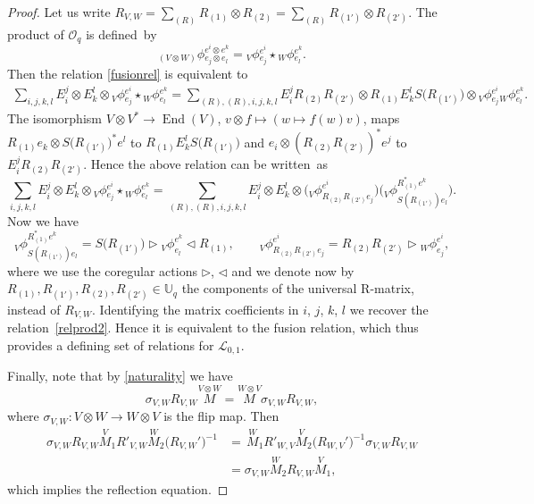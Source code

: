 \documentclass[pdftex]{sigma}%
\numberwithin{equation}{section}
\numberwithin{figure}{section}
\newcommand{\Oq}{\Oo_{q}}
\newcommand{\mUq}{\mathbb{U}_q}
\newcommand{\Ll}{{\mathcal L}}
\newcommand{\Oo}{{\mathcal O}}
\newcommand{\ra}{\rightarrow}
\begin{document}
\begin{proof} Let us write $\textstyle R_{V,W}=\sum_{(R)}R_{(1) }\otimes R_{(2)}=\sum_{(R)}R_{(1') }\otimes R_{(2')}$. The product of $\Oq$ is defi\-ned~by
\[{}_{(V\otimes W)}\phi{}^{e^i\otimes e^k}_{e_j\otimes e_l} = {}_V\phi{}^{e^i}_{e_j}\star {}_W\phi{}^{e^k}_{e_l}.\]
Then the relation \eqref{fusionrel} is equivalent to
\begin{gather*}
\sum_{i,j,k,l} E_i^j\otimes E_k^l\otimes {}_V\phi{}^{e^i}_{e_j}\star {}_W\phi{}^{e^k}_{e_l} = \sum_{(R),(R),i,j,k,l} E_i^jR_{(2)}R_{(2')}\otimes R_{(1)}E_k^l S\big(R_{(1')}\big)\otimes {}_V\phi{}^{e^i}_{e_j}{}_W\phi{}^{e^k}_{e_l}.
\end{gather*}
The isomorphism $V \otimes V^* \rightarrow \operatorname{End}(V)$, $v\otimes f\mapsto (w\mapsto f(w)v)$, maps $R_{(1)}e_k \otimes S\big(R_{(1')}\big)^*e^l$ to $R_{(1)}E_k^l S\big(R_{(1')}\big)$ and $e_i \otimes (R_{(2)}R_{(2')})^*e^j$ to $E_i^jR_{(2)}R_{(2')}$. Hence the above relation can be writ\-ten~as
\[
\sum_{i,j,k,l} E_i^j\otimes E_k^l\otimes {}_V\phi{}^{e^i}_{e_j}\star {}_W\phi{}^{e^k}_{e_l} = \sum_{(R),(R),i,j,k,l} E_i^j\otimes E_k^l \otimes \big({}_V\phi^{e^i}_{R_{(2)}R_{(2')}e_j}\big)\Big({}_V\phi^{R_{(1)} ^*e^k}_{ S(R_{(1')})e_l}\Big).
\]
Now we have
\[
{}_V\phi^{R_{(1)} ^*e^k}_{ S(R_{(1')})e_l} = S\big(R_{(1')}\big) \rhd {}_V\phi^{e^k}_{e_l} \lhd R_{(1)} ,\qquad {}_V\phi^{e^i}_{R_{(2)}R_{(2')}e_j} = R_{(2)}R_{(2')}\rhd {}_W\phi^{e^i}_{e_j},
\]
where we use the coregular actions $\rhd$, $\lhd$ and we denote now by $R_{(1)}, R_{(1')}, R_{(2)}, R_{(2')}\in \mUq$ the components of the universal R-matrix, instead of $R_{V,W}$. Identifying the matrix coefficients in $i$, $j$, $k$, $l$ we recover the relation~\eqref{relprod2}. Hence it is equivalent to the fusion relation, which thus provides a defining set of relations for $\Ll_{0,1}$.

Finally, note that by \eqref{naturality} we have
\[
\sigma_{V,W}R_{V,W} \stackrel{V\otimes W}{M} = \stackrel{W\otimes V}{M}\sigma_{V,W}R_{V,W},
\]
where $\sigma_{V,W} \colon V\otimes W \ra W \otimes V$ is the flip map. Then
\begin{align*}
\sigma_{V,W}R_{V,W}\stackrel{V}{M}_1 {R'}_{V,W}\stackrel{W}{M}_2\big(R_{V,W}'\big)^{-1} & = \, \stackrel{W}{M}_1 {R'}_{W,V}\stackrel{V}{M}_2\big(R_{W,V}'\big)^{-1} \sigma_{V,W}R_{V,W}\\
& = \sigma_{V,W} \stackrel{W}{M}_2 {R}_{V,W}\stackrel{V}{M}_1,
\end{align*}
which implies the reflection equation.
\end{proof}
\end{document}
